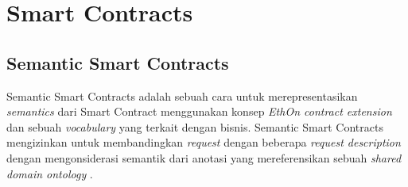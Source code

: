 \section{Smart Contracts}
\label{sec:smart-contract}











\subsection{Semantic Smart Contracts}
\label{subsec:semantic-smart-contracts}
Semantic Smart Contracts adalah sebuah cara untuk merepresentasikan \textit{semantics} dari Smart Contract menggunakan konsep \textit{EthOn contract extension} dan sebuah \textit{vocabulary} yang terkait dengan bisnis. Semantic Smart Contracts mengizinkan untuk membandingkan \textit{request} dengan beberapa \textit{request description} dengan mengonsiderasi semantik dari anotasi yang mereferensikan sebuah \textit{shared domain ontology} \parencite{baqa2019semantic}.
